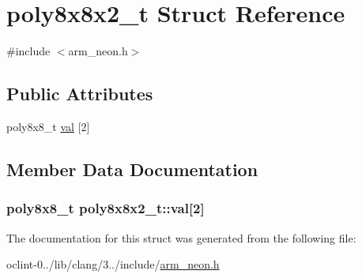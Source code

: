 \hypertarget{structpoly8x8x2__t}{\section{poly8x8x2\-\_\-t Struct Reference}
\label{structpoly8x8x2__t}
}


{\ttfamily \#include $<$arm\-\_\-neon.\-h$>$}

\subsection*{Public Attributes}
\begin{DoxyCompactItemize}
\item 
poly8x8\-\_\-t \hyperlink{structpoly8x8x2__t_afb00c4ee129d10fe30a71e589452ae73}{val} \mbox{[}2\mbox{]}
\end{DoxyCompactItemize}


\subsection{Member Data Documentation}
\hypertarget{structpoly8x8x2__t_afb00c4ee129d10fe30a71e589452ae73}{
\subsubsection[{val}]{\setlength{\rightskip}{0pt plus 5cm}poly8x8\-\_\-t poly8x8x2\-\_\-t\-::val\mbox{[}2\mbox{]}}}\label{structpoly8x8x2__t_afb00c4ee129d10fe30a71e589452ae73}


The documentation for this struct was generated from the following file\-:\begin{DoxyCompactItemize}
\item 
oclint-\/0../lib/clang/3../include/\hyperlink{arm__neon_8h}{arm\-\_\-neon.\-h}\end{DoxyCompactItemize}
